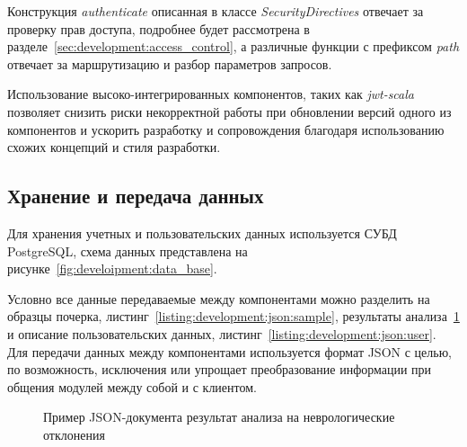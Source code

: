 Конструкция \emph{authenticate} описанная в классе \emph{SecurityDirectives} отвечает за проверку прав доступа, подробнее будет рассмотрена в разделе~\ref{sec:development:access_control}, а различные функции с префиксом \emph{path} отвечает за маршрутизацию и разбор параметров запросов. 

Использование высоко-интегрированных компонентов, таких как \emph{jwt-scala} позволяет снизить риски некорректной работы при обновлении версий одного из компонентов и ускорить разработку и сопровождения благодаря использованию схожих концепций и стиля разработки.

\subsection{Хранение и передача данных}
Для хранения учетных и пользовательских данных используется СУБД PostgreSQL, схема данных представлена на рисунке~\ref{fig:develoipment:data_base}.

Условно все данные передаваемые между компонентами можно разделить на образцы почерка, листинг~\ref{listing:development:json:sample}, результаты анализа~\ref{listing:development:json:result} и описание пользовательских данных, листинг~\ref{listing:development:json:user}. Для передачи данных между компонентами используется формат JSON с целью, по возможность, исключения или упрощает преобразование информации при общения модулей между собой и с клиентом. 
\begin{figure}[h]
    \centering
    
    \caption{Пример JSON-документа результат анализа на неврологические отклонения}
    \label{listing:development:json:result}
\end{figure}

